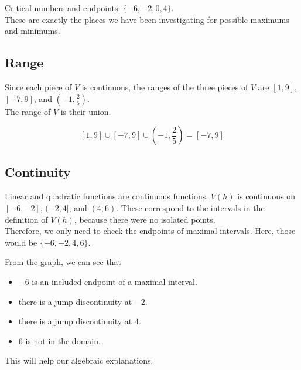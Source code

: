 \documentclass{ximera}
\begin{document}
Critical numbers and endpoints: $\{ -6, -2, 0, 4 \}$. \\

These are exactly the places we have been investigating for possible maximums and minimums.






\subsection{Range} 


Since each piece of $V$ is continuous, the ranges of the three pieces of $V$ are $[1, 9]$, $[-7, 9]$, and $\left( -1, \frac{2}{5} \right)$. \\

The range of $V$ is their union.

\[
[1, 9] \cup [-7, 9] \cup \left( -1, \frac{2}{5} \right) = [-7, 9]
\]






\subsection{Continuity} 


Linear and quadratic functions are continuous functions.  $V(h)$ is continuous on $[-6, -2]$, $(-2, 4]$, and $(4, 6)$.  These correspond to the intervals in the definition of $V(h)$, because there were no isolated points. \\

Therefore, we only need to check the endpoints of maximal intervals.  Here, those would be $\{ -6, -2, 4, 6 \}$.



\begin{observation} 
From the graph, we can see that 

\begin{itemize}
\item $-6$ is an included endpoint of a maximal interval.  
\item there is a jump discontinuity at $-2$.
\item there is a jump discontinuity at $4$.
\item $6$ is not in the domain.
\end{itemize}



\end{observation}


This will help our algebraic explanations. \\
\end{document}
